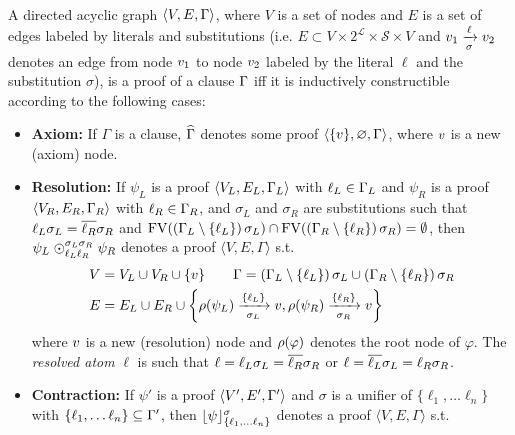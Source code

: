 \begin{definition} 
\label{def:proof} \hfill \\
A directed acyclic graph $\langle V, E, \clause \rangle$, where $V$ is a set of nodes and $E$ is a
set of edges labeled by literals and substitutions (i.e. $E \subset V \times 2^{\mathcal{L}} \times \mathcal{S} \times V$ and $\n_1
\xrightarrow[\sigma]{\ell} \n_2$ denotes an edge from node $\n_1$ to node $\n_2$ labeled by the literal $\ell$ and the substitution $\sigma$), is a
proof of a clause $\clause$ iff it is inductively constructible according to the following cases:
%
\begin{itemize}
  \item \textbf{Axiom:} If $\Gamma$ is a clause, $\axiom{\Gamma}$ denotes some proof $\langle \{ \n \}, \varnothing,
    \Gamma \rangle$, where $\n$ is a new (axiom) node.
  \item \textbf{Resolution:} If $\psi_L$ is a proof $\langle V_L, E_L, \clause_L \rangle$ with $\ell_L \in \clause_L$ and
    $\psi_R$ is a proof $\langle V_R, E_R, \clause_R \rangle$ with $\ell_R \in \clause_R$, and 
    $\sigma_L$ and $\sigma_R$ are substitutions such that
    $\ell_L \sigma_L = \dual{\ell_R} \sigma_R$ and
    $\freevar{\left( \clause_L \setminus \left\{ \ell_L \right\} \right) \sigma_L} \cap 
     \freevar{\left( \clause_R
                    \setminus \left\{ \ell_R \right\} \right) \sigma_R} = \emptyset$, 
    then
    $\psi_L \res{\ell_L}{\sigma_L}{\ell_R}{\sigma_R} \psi_R$ denotes a proof $\langle V, E, \Gamma \rangle$ s.t.
    \begin{align*}
      V &= V_L \cup V_R \cup \{\n \} \qquad
      \Gamma = \left( \clause_L \setminus \left\{ \ell_L \right\} \right) \sigma_L \cup \left( \clause_R
                    \setminus \left\{ \ell_R \right\} \right) \sigma_R  \\
      E &= E_L \cup E_R \cup
                    \left\{ \raiz{\psi_L} \xrightarrow[\sigma_L]{\{\ell_L\} } \n, 
                            \raiz{\psi_R} \xrightarrow[\sigma_R]{\{\ell_R\} } \n \right\}
    \end{align*}
    where $\n$ is a new (resolution) node and $\raiz{\varphi}$ denotes the root node of $\varphi$. The \emph{resolved atom} $\ell$ is such that $\ell = \ell_L \sigma_L = \dual{\ell_R} \sigma_R$ or $\ell = \dual{\ell_L} \sigma_L = \ell_R \sigma_R$.
  \item \textbf{Contraction:} If $\psi'$ is a proof $\langle V', E', \clause' \rangle$ and $\sigma$ is a unifier of $\{\ell_1, \ldots \ell_n\}$ with $\{\ell_1, \ldots \ell_n\} \subseteq \clause'$, then $\con{\psi}{\{\ell_1, \ldots \ell_n\}}{\sigma}$ denotes a proof $\langle V, E, \Gamma \rangle$ s.t.

\end{itemize}
\end{definition}

